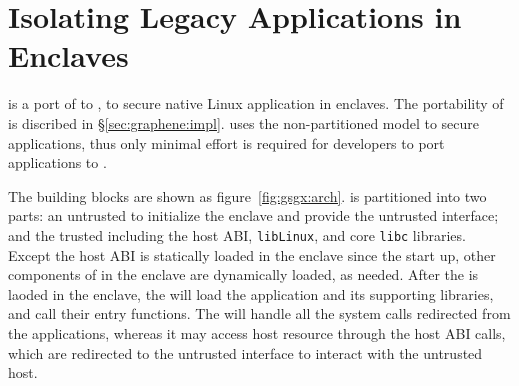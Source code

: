 \section{Isolating Legacy Applications in \intel{} \sgx{} Enclaves}
\label{sec:graphene:sgx}

\sysname{} is a port of \graphene{} \libos{} to \sgx{},
to secure native Linux application in \sgx{} enclaves.
The portability of \graphene{} is discribed in \S\ref{sec:graphene:impl}.
\sysname{} uses the non-partitioned model
to secure applications,
thus only minimal effort is required for developers
to port applications to \sysname{}.




The building blocks are shown as figure~\ref{fig:gsgx:arch}.
\sysname{} is partitioned into two parts:
an untrusted \pal{} to initialize the enclave and provide the untrusted interface;
and the trusted \libos{} including the host ABI, {\tt libLinux}, and core {\tt libc} libraries.
Except the host ABI is statically loaded in the enclave since the start up,
other components of \sysname{} in the enclave are dynamically loaded,
as needed. 
After the \libos{} is laoded in the enclave,
the \libos{} will load the application and its supporting libraries,
and call their entry functions.
The \libos{} will handle all the system calls redirected from the applications,
whereas it may access host resource through the host ABI calls,
which are redirected to the untrusted interface
to interact with the untrusted host. 

